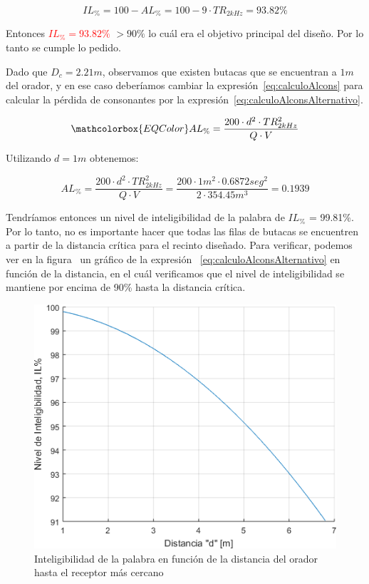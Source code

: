 \begin{equation*}
   \boxed{ IL_{\%} = 100 - AL_{\%} = 100 - 9\cdot TR_{2kHz} =  93.82\% }
\end{equation*}

\par Entonces \textcolor{red}{ $IL_{\%} =93.82\%$ } $> 90\% $ lo cuál era el objetivo principal del diseño. Por lo tanto se cumple lo pedido.\\

\par Dado que $D_c = 2.21m$, observamos que existen butacas que se encuentran a $1m$ del orador, y en ese caso deberíamos cambiar la expresión~\eqref{eq:calculoAlcons} para calcular la pérdida de consonantes por la expresión~\eqref{eq:calculoAlconsAlternativo}.

\begin{equation}
    \mathcolorbox{EQColor}{ AL_{\%} = \frac{200 \cdot d^2 \cdot TR_{2kHz}^2}{Q\cdot V} }
    \label{eq:calculoAlconsAlternativo}
\end{equation}

Utilizando $d=1m$ obtenemos:

\begin{equation*}
    \boxed{ AL_{\%} = \frac{200 \cdot d^2 \cdot TR_{2kHz}^2}{Q\cdot V} = \frac{200 \cdot 1m^2 \cdot 0.6872 seg^2}{2 \cdot 354.45m^3} = 0.1939 }
\end{equation*}

\par Tendríamos entonces un nivel de inteligibilidad de la palabra de $IL_{\%}$ =  99.81\%. Por lo tanto, no es importante hacer que todas las filas de butacas se encuentren a partir de la distancia crítica para el recinto diseñado. Para verificar, podemos ver en la figura~ un gráfico de la expresión~ \eqref{eq:calculoAlconsAlternativo} en función de la distancia, en el cuál verificamos que el nivel de inteligibilidad se mantiene por encima de 90\% hasta la distancia crítica.

\begin{figure}[H]
	\centering
	\includegraphics[width=1\textwidth]{./img/nivel_inteligibilidad.png}
	\caption{Inteligibilidad de la palabra en función de la distancia del orador hasta el receptor más cercano}
	\label{fig:nivel_inteligibilidad}
\end{figure}